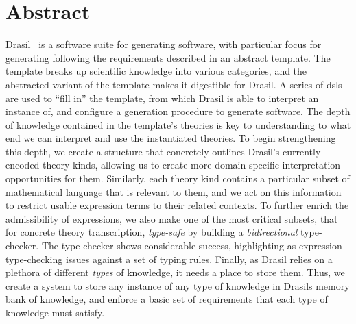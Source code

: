 \chapter{Abstract}
\label{chap:abstract}

Drasil~\cite{Drasil2021} is a software suite for generating software, with
particular focus for generating  following the requirements described
in an abstract  template. The template breaks up scientific knowledge
into various categories, and the abstracted variant of the template makes it
digestible for Drasil. A series of \acsp{dsl} are used to ``fill in'' the
template, from which Drasil is able to interpret an instance of, and configure a
generation procedure to generate software. The depth of knowledge contained in
the template's theories is key to understanding to what end we can interpret and
use the instantiated theories. To begin strengthening this depth, we create a
structure that concretely outlines Drasil's currently encoded theory kinds,
allowing us to create more domain-specific interpretation opportunities for
them. Similarly, each theory kind contains a particular subset of mathematical
language that is relevant to them, and we act on this information to restrict
usable expression terms to their related contexts. To further enrich the
admissibility of expressions, we also make one of the most critical subsets,
that for concrete theory transcription, \textit{type-safe} by building a
\textit{bidirectional} type-checker. The type-checker shows considerable
success, highlighting as expression type-checking issues against a set of typing
rules. Finally, as Drasil relies on a plethora of different \textit{types} of
knowledge, it needs a place to store them. Thus, we create a system to store any
instance of any type of knowledge in Drasils memory bank of knowledge, and
enforce a basic set of requirements that each type of knowledge must satisfy.
